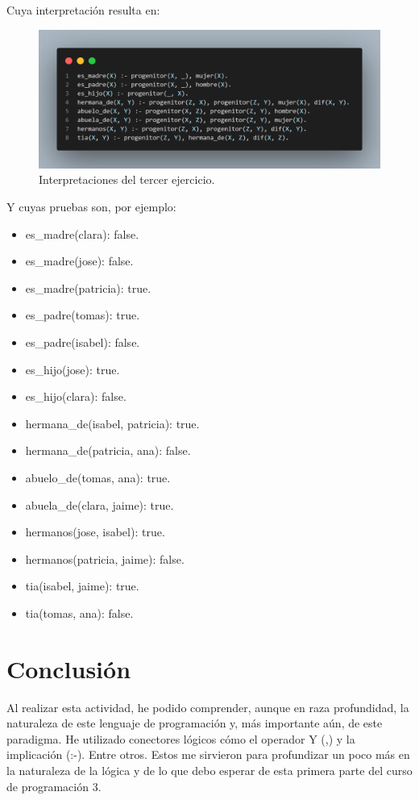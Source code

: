 \documentclass{article}
\begin{document}
Cuya interpretación resulta en:
\begin{figure}[h]
    \centering
    \includegraphics[width=1\textwidth]{./img/results_4.png}
    \caption{Interpretaciones del tercer ejercicio.}
    \label{fig:results_4}
\end{figure}

Y cuyas pruebas son, por ejemplo:
\begin{itemize}
    \item es\_madre(clara): false.
    \item es\_madre(jose): false.
    \item es\_madre(patricia): true.
    \item es\_padre(tomas): true.
    \item es\_padre(isabel): false.
    \item es\_hijo(jose): true.
    \item es\_hijo(clara): false.
    \item hermana\_de(isabel, patricia): true.
    \item hermana\_de(patricia, ana): false.
    \item abuelo\_de(tomas, ana): true.
    \item abuela\_de(clara, jaime): true.
    \item hermanos(jose, isabel): true.
    \item hermanos(patricia, jaime): false.
    \item tia(isabel, jaime): true.
    \item tia(tomas, ana): false.
  \end{itemize}  

\section*{Conclusión}
Al realizar esta actividad, he podido comprender, aunque en raza profundidad, la naturaleza de este lenguaje de programación y, más importante aún, de este paradigma. He utilizado conectores lógicos cómo el operador Y (,) y la implicación (:-). Entre otros. Estos me sirvieron para profundizar un poco más en la naturaleza de la lógica y de lo que debo esperar de esta primera parte del curso de programación 3.
\end{document}
